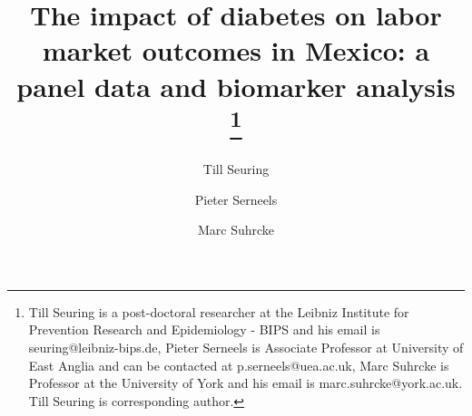 \documentclass[12pt,english]{article}
\providecommand{\DIFaddbegin}{} %
\providecommand{\DIFaddend}{} %
\providecommand{\DIFdelbegin}{} %
\providecommand{\DIFdelend}{} %
\begin{document}
\title{The impact of diabetes on labor market outcomes in Mexico: a panel data and biomarker analysis\DIFdelbegin %
\DIFdelend \DIFaddbegin \thanks{Till Seuring is a post-doctoral researcher at the Leibniz Institute for Prevention Research and Epidemiology - BIPS and his email is seuring@leibniz-bips.de,  Pieter Serneels is Associate Professor at University of East Anglia and can be contacted at p.serneels@uea.ac.uk, Marc Suhrcke is Professor at the University of York and his email is marc.suhrcke@york.ac.uk. Till Seuring is corresponding author.}\DIFaddend }

\author[1,2]{Till Seuring%
	\DIFdelbegin %
\DIFdelend }
\author[2]{Pieter Serneels}
\author[3]{Marc Suhrcke}

\end{document}
